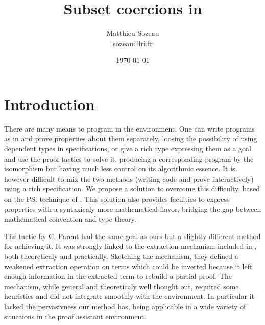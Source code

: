 \documentclass[twocolumn]{article}
\author{Matthieu Sozeau \\
  sozeau@lri.fr}
\title{Subset coercions in \Coq}
\date{\today}
\begin{document}
\maketitle


\section{Introduction}
There are many means to program in the \Coq{} environment. One
can write programs as in \ML{} and prove properties about them
separately, loosing the possibility of using dependent types in
specifications, or give a rich type expressing them as a goal and use the
proof tactics to solve it, producing a corresponding program by the
\CurryHoward isomorphism but having much less control on its algorithmic
essence. It is however difficult to mix the two methods
(writing code and prove interactively) using a rich specification. We
propose a solution to overcome this difficulty, based on the \ps{}
\cite{Shankar&Owre:WADT99} technique of \PVS{}
\cite{PVS:Language,PVS:Semantics-TR}. This solution also provides
facilities to express properties with a syntaxicaly more mathematical flavor,
bridging the gap between mathematical convention and type theory.

The \Program{} tactic by C. Parent \cite{conf/mpc/Parent95} had the same
goal as ours but a slightly different method for achieving it. It was strongly
linked to the extraction mechanism included in \Coq, both theoreticaly
and practically. Sketching the mechanism, they defined a weakened
extraction operation on \CIC{} terms which could be inverted because it left enough
information in the extracted term to rebuild a partial proof. The
mechanism, while general and theoreticaly well thought out, required
some heuristics and did not integrate smoothly with the \Coq{}
environment. In particular it lacked the pervasivness our method has,
being applicable in a wide variety of situations in the proof assistant
environment.
\end{document}
